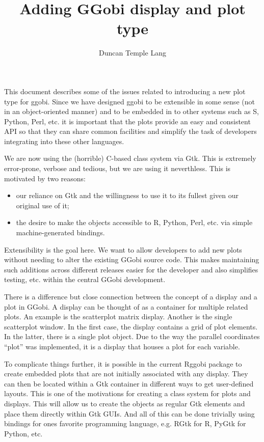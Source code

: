\documentclass{article}
\title{Adding GGobi display and plot type}
\author{Duncan Temple Lang}
\begin{document}
\maketitle

This document describes some of the issues related to introducing a
new plot type for ggobi.  Since we have designed ggobi to be
extensible in some sense (not in an object-oriented manner) and to be
embedded in to other systems such as S, Python, Perl, etc.  it is
important that the plots provide an easy and consistent API so that
they can share common facilities and simplify the task of developers
integrating into these other languages.

We are now using the (horrible) C-based class system via Gtk. This is
extremely error-prone, verbose and tedious,
but we are using it neverthless.
This is motivated by two reasons:
\begin{itemize}
\item our reliance on Gtk and the willingness to use it to its fullest
given our original use of it;
\item the desire to make the objects accessible 
 to R, Python, Perl, etc. via simple machine-generated bindings.
\end{itemize}


Extensibility is the goal here. We want to allow developers to add new
plots without needing to alter the existing GGobi source code.  This
makes maintaining such additions across different releases easier for
the developer and also simplifies testing, etc. within the central
GGobi development.

There is a difference but close connection between the concept of a
display and a plot in GGobi.  A display can be thought of as a
container for multiple related plots.  An example is the scatterplot
matrix display.  Another is the single scatterplot window.  In the
first case, the display contains a grid of plot elements.  In the
latter, there is a single plot object.  Due to the way the parallel
coordinates ``plot'' was implemented, it is a display that houses a
plot for each variable.

To complicate things further, it is possible in the
current Rggobi package to create embedded plots
that are not initially associated with any display.
They can then be located within a Gtk container
in different ways to get user-defined layouts.
This is one of the motivations for creating a
class system for plots and displays. This will 
allow us to create the objects as regular Gtk elements
and place them directly within Gtk GUIs.
And all of this can be done trivially using 
bindings for ones favorite programming language,
e.g. RGtk for R, PyGtk for Python, etc.
\end{document}
